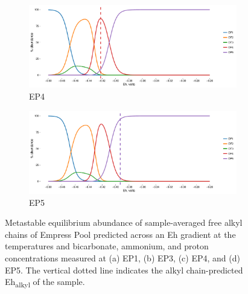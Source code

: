 {\begin{figure}[h]
    \begin{subfigure}[b]{\linewidth}
       	\includegraphics[width=1\linewidth]{"figs_app2/Empress OF4_thermo"}
       	\caption{EP4}
        \label{fig:EP4_thermo}
    \end{subfigure}
    \begin{subfigure}[b]{\linewidth}
    	\includegraphics[width=1\linewidth]{"figs_app2/Empress OF5_thermo"}
    	\caption{EP5}
        \label{fig:EP5_thermo}
    \end{subfigure}
    
    \caption[Metastable equilibrium abundance of sample-averaged free alkyl chains of Empress Pool]{Metastable equilibrium abundance of sample-averaged free alkyl chains of Empress Pool predicted across an Eh gradient at the temperatures and bicarbonate, ammonium, and proton concentrations measured at (a) EP1, (b) EP3, (c) EP4, and (d) EP5. The vertical dotted line indicates the alkyl chain-predicted Eh\textsubscript{alkyl} of the sample.}
    \label{fig:empress_thermo}
\end{figure}
\doublespace
}



